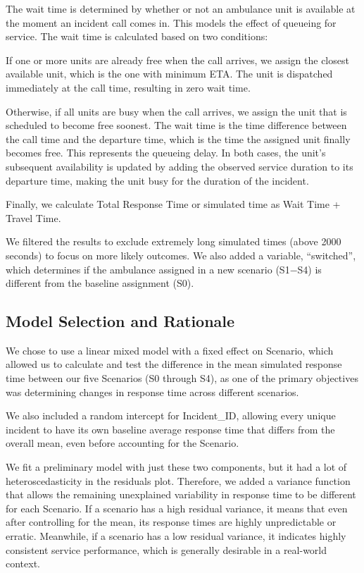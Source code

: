 \documentclass[
]{article}
\begin{document}
The wait time is determined by whether or not an ambulance unit is
available at the moment an incident call comes in. This models the
effect of queueing for service. The wait time is calculated based on two
conditions:

If one or more units are already free when the call arrives, we assign
the closest available unit, which is the one with minimum ETA. The unit
is dispatched immediately at the call time, resulting in zero wait time.

Otherwise, if all units are busy when the call arrives, we assign the
unit that is scheduled to become free soonest. The wait time is the time
difference between the call time and the departure time, which is the
time the assigned unit finally becomes free. This represents the
queueing delay. In both cases, the unit's subsequent availability is
updated by adding the observed service duration to its departure time,
making the unit busy for the duration of the incident.

Finally, we calculate Total Response Time or simulated time as Wait Time
+ Travel Time.

We filtered the results to exclude extremely long simulated times (above
2000 seconds) to focus on more likely outcomes. We also added a
variable, ``switched'', which determines if the ambulance assigned in a
new scenario (S1−S4) is different from the baseline assignment (S0).

\subsection{Model Selection and
Rationale}\label{model-selection-and-rationale}

We chose to use a linear mixed model with a fixed effect on Scenario,
which allowed us to calculate and test the difference in the mean
simulated response time between our five Scenarios (S0 through S4), as
one of the primary objectives was determining changes in response time
across different scenarios.

We also included a random intercept for Incident\_ID, allowing every
unique incident to have its own baseline average response time that
differs from the overall mean, even before accounting for the Scenario.

We fit a preliminary model with just these two components, but it had a
lot of heteroscedasticity in the residuals plot. Therefore, we added a
variance function that allows the remaining unexplained variability in
response time to be different for each Scenario. If a scenario has a
high residual variance, it means that even after controlling for the
mean, its response times are highly unpredictable or erratic. Meanwhile,
if a scenario has a low residual variance, it indicates highly
consistent service performance, which is generally desirable in a
real-world context.
\end{document}
